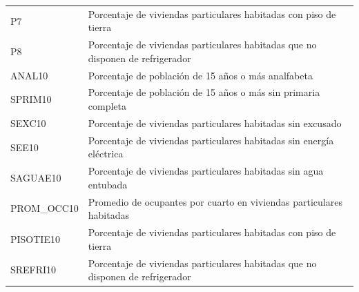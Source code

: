 \documentclass[paper=letter, fontsize=11pt]{scrartcl}
\numberwithin{equation}{section} %
\numberwithin{figure}{section} %
\numberwithin{table}{section} %
\begin{document}
\begin{enumerate}
\begin{enumerate}
\begin{table}[H]
\begin{tabular}{ll}
P7             	&	     Porcentaje de viviendas particulares habitadas con piso de tierra            	\\
P8             	&	     Porcentaje de viviendas particulares habitadas que no disponen de refrigerador            	\\
ANAL10    	&	      Porcentaje de población de 15 años o más analfabeta    	\\
SPRIM10           	&	     Porcentaje de población de 15 años o más sin primaria completa    	\\
SEXC10    	&	      Porcentaje de viviendas particulares habitadas sin excusado    	\\
SEE10             	&	     Porcentaje de viviendas particulares habitadas sin energía eléctrica    	\\
SAGUAE10         	&	       Porcentaje de viviendas particulares habitadas sin agua entubada    	\\
PROM\_OCC10   	&	      Promedio de ocupantes por cuarto en viviendas particulares habitadas    	\\
PISOTIE10             	&	     Porcentaje de viviendas particulares habitadas con piso de tierra    	\\
SREFRI10             	&	       Porcentaje de viviendas particulares habitadas que no disponen de refrigerador           	\\

   \hline
\end{tabular}
\end{table}
%

\begin{table}[H]
\centering
\begin{tabular}{ll}
  \hline


\end{tabular}
\end{table}
\end{enumerate}
\end{enumerate}
\end{document}
